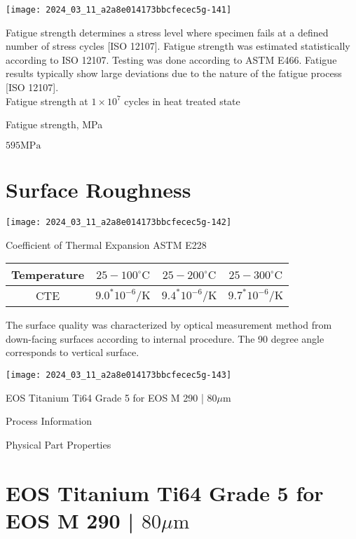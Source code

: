 \documentclass[10pt]{article}
\begin{document}
\begin{center}
\texttt{[image: 2024\_03\_11\_a2a8e014173bbcfecec5g-141]}
\end{center}

Fatigue strength determines a stress level where specimen fails at a defined number of stress cycles [ISO 12107]. Fatigue strength was estimated statistically according to ISO 12107. Testing was done according to ASTM E466. Fatigue results typically show large deviations due to the nature of the fatigue process [ISO 12107].\\
Fatigue strength at $1 \times 10^{7}$ cycles in heat treated state

Fatigue strength, MPa

$595 \mathrm{MPa}$

\section*{Surface Roughness}
\begin{center}
\texttt{[image: 2024\_03\_11\_a2a8e014173bbcfecec5g-142]}
\end{center}

Coefficient of Thermal Expansion ASTM E228

\begin{center}
\begin{tabular}{|c|c|c|c|}
\hline
Temperature & $25-100^{\circ} \mathrm{C}$ & $25-200^{\circ} \mathrm{C}$ & $25-300^{\circ} \mathrm{C}$ \\
\hline
CTE & $9.0^{*} 10^{-6} / \mathrm{K}$ & $9.4^{*} 10^{-6} / \mathrm{K}$ & $9.7^{*} 10^{-6} / \mathrm{K}$ \\
\hline
\end{tabular}
\end{center}

The surface quality was characterized by optical measurement method from down-facing surfaces according to internal procedure. The 90 degree angle corresponds to vertical surface.

\begin{center}
\texttt{[image: 2024\_03\_11\_a2a8e014173bbcfecec5g-143]}
\end{center}

EOS Titanium Ti64 Grade 5 for EOS M 290 | $80 \mu \mathrm{m}$

Process Information

Physical Part Properties

\section*{EOS Titanium Ti64 Grade 5 for EOS M 290 | $80 \mu \mathrm{m}$}
\end{document}
